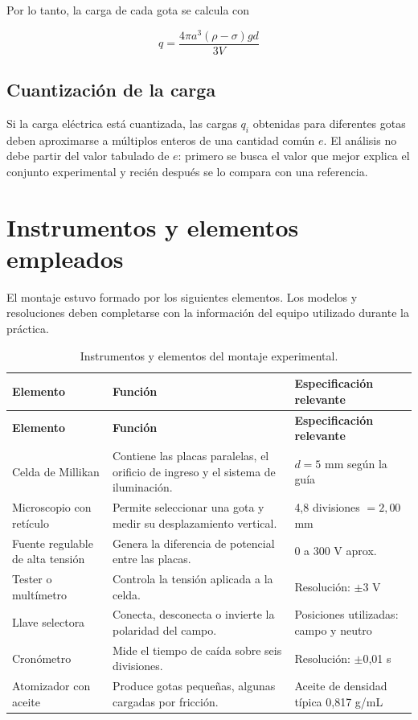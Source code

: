 \documentclass{article}
\begin{document}
Por lo tanto, la carga de cada gota se calcula con

\begin{equation}
q=\frac{4\pi a^3(\rho-\sigma)gd}{3V}
\end{equation}

\subsection{Cuantización de la carga}

Si la carga eléctrica está cuantizada, las cargas $q_i$ obtenidas para diferentes gotas deben aproximarse a múltiplos enteros de una cantidad común $e$. El análisis no debe partir del valor tabulado de $e$: primero se busca el valor que mejor explica el conjunto experimental y recién después se lo compara con una referencia.

\section{Instrumentos y elementos empleados}

El montaje estuvo formado por los siguientes elementos. Los modelos y resoluciones deben completarse con la información del equipo utilizado durante la práctica.

\begin{longtable}{@{}L{3.1cm}L{5.2cm}L{4.6cm}@{}}
    \caption{Instrumentos y elementos del montaje experimental.}\\
    \toprule
    \textbf{Elemento} & \textbf{Función} & \textbf{Especificación relevante} \\
    \midrule
    \endfirsthead
    \toprule
    \textbf{Elemento} & \textbf{Función} & \textbf{Especificación relevante} \\
    \midrule
    \endhead
    \bottomrule
    \endfoot
    Celda de Millikan & Contiene las placas paralelas, el orificio de ingreso y el sistema de iluminación. & $d=5$ mm según la guía \\
    Microscopio con retículo & Permite seleccionar una gota y medir su desplazamiento vertical. & 4,8 divisiones $=2,00$ mm \\
    Fuente regulable de alta tensión & Genera la diferencia de potencial entre las placas. & 0 a 300 V aprox. \\
    Tester o multímetro & Controla la tensión aplicada a la celda. & Resolución: $\pm$3 V \\
    Llave selectora & Conecta, desconecta o invierte la polaridad del campo. & Posiciones utilizadas: campo y neutro \\
    Cronómetro & Mide el tiempo de caída sobre seis divisiones. & Resolución: $\pm$0,01 s \\
    Atomizador con aceite & Produce gotas pequeñas, algunas cargadas por fricción. & Aceite de densidad típica 0,817 g/mL \\
\end{longtable}
\end{document}
